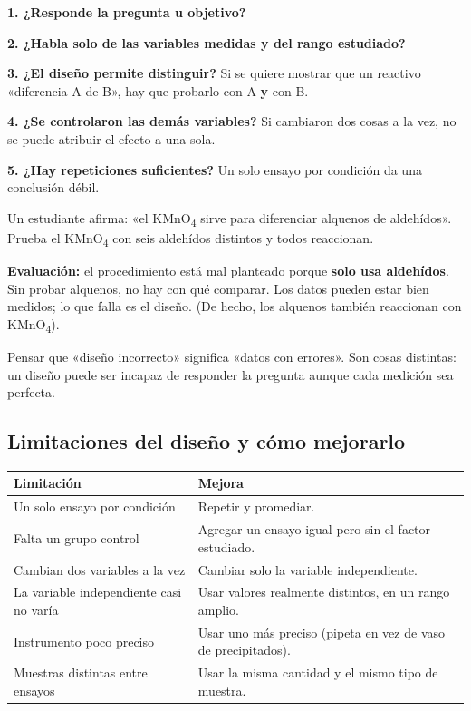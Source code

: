  

\textbf{1. ¿Responde la pregunta u objetivo?}

 

\textbf{2. ¿Habla solo de las variables medidas y del rango estudiado?}

 

\textbf{3. ¿El diseño permite distinguir?} Si se quiere mostrar que un reactivo «diferencia A de B», hay que probarlo con A \textbf{y} con B.

 

\textbf{4. ¿Se controlaron las demás variables?} Si cambiaron dos cosas a la vez, no se puede atribuir el efecto a una sola.

 

\textbf{5. ¿Hay repeticiones suficientes?} Un solo ensayo por condición da una conclusión débil.

  
\begin{ejemplo} Un estudiante afirma: «el KMnO\textsubscript{4} sirve para diferenciar alquenos de aldehídos». Prueba el KMnO\textsubscript{4} con seis aldehídos distintos y todos reaccionan.\par \textbf{Evaluación:} el procedimiento está mal planteado porque \textbf{solo usa aldehídos}. Sin probar alquenos, no hay con qué comparar. Los datos pueden estar bien medidos; lo que falla es el diseño. (De hecho, los alquenos también reaccionan con KMnO\textsubscript{4}).\end{ejemplo}
 
\begin{ojo} Pensar que «diseño incorrecto» significa «datos con errores». Son cosas distintas: un diseño puede ser incapaz de responder la pregunta aunque cada medición sea perfecta.\end{ojo}
\subsection{Limitaciones del diseño y cómo mejorarlo}
\begin{center}\small
\begin{tabularx}{\linewidth}{@{}>{\raggedright\arraybackslash\hsize=0.99\hsize}X>{\raggedright\arraybackslash\hsize=1.01\hsize}X@{}}
\toprule
\textbf{Limitación} & \textbf{Mejora} \\
\midrule
Un solo ensayo por condición & Repetir y promediar. \\
Falta un grupo control & Agregar un ensayo igual pero sin el factor estudiado. \\
Cambian dos variables a la vez & Cambiar solo la variable independiente. \\
La variable independiente casi no varía & Usar valores realmente distintos, en un rango amplio. \\
Instrumento poco preciso & Usar uno más preciso (pipeta en vez de vaso de precipitados). \\
Muestras distintas entre ensayos & Usar la misma cantidad y el mismo tipo de muestra. \\
\bottomrule
\end{tabularx}
\end{center}
  
